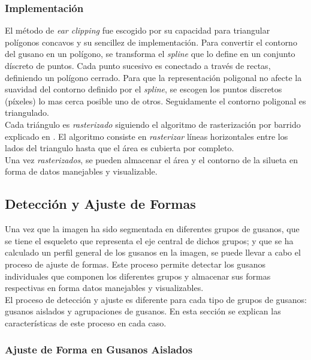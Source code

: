 \subsubsection{Implementaci\'on}

El m\'etodo de \emph{ear clipping} fue escogido por su capacidad para triangular pol\'igonos
concavos y su sencillez de implementaci\'on. Para convertir el contorno del gusano en un 
pol\'igono, se transforma el \emph{spline} que lo define en un conjunto d\'iscreto de puntos.
Cada punto sucesivo es conectado a trav\'es de rectas, definiendo un pol\'igono cerrado. 
Para que la representaci\'on poligonal no afecte la suavidad del contorno definido por el
\emph{spline}, se escogen los puntos discretos (p\'ixeles) lo mas cerca posible uno de otros.
Seguidamente el contorno poligonal es triangulado.\\

Cada tri\'angulo es \emph{rasterizado} siguiendo el algoritmo de rasterizaci\'on por barrido
explicado en \cite{scanconversion}. El algoritmo consiste en \emph{rasterizar} 
l\'ineas horizontales entre los lados del triangulo hasta que el \'area es cubierta por completo.\\

Una vez \emph{rasterizados}, se pueden almacenar el \'area y el contorno de la silueta en
forma de datos manejables y visualizable. 

\subsection{Detecci\'on y Ajuste de Formas}
\label{sec:metfit}

Una vez que la imagen ha sido segmentada en diferentes grupos de gusanos, que se tiene
el esqueleto que representa el eje central de dichos grupos; y que se ha calculado un
perfil general de los gusanos en la imagen, se puede llevar a cabo el proceso de ajuste
de formas. Este proceso permite detectar los gusanos individuales que componen los 
diferentes grupos y almacenar sus formas respectivas en forma datos manejables y visualizables.\\

El proceso de detecci\'on y ajuste es diferente para cada tipo de grupos de gusanos: 
gusanos aislados y agrupaciones de gusanos. En esta secci\'on se explican las 
caracter\'isticas de este proceso en cada caso.

\subsubsection{Ajuste de Forma en Gusanos Aislados}
\label{sec:metiso}

